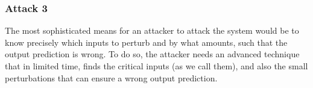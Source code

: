 \subsubsection{Attack 3}
The most sophisticated means for an attacker to attack the system would be to know precisely which inputs to perturb and by what amounts,
 such that the output prediction is wrong. 
To do so, the attacker needs an advanced technique that in limited time, finds the critical inputs (as we call them),
 and also the small perturbations that can ensure a wrong output prediction. 















